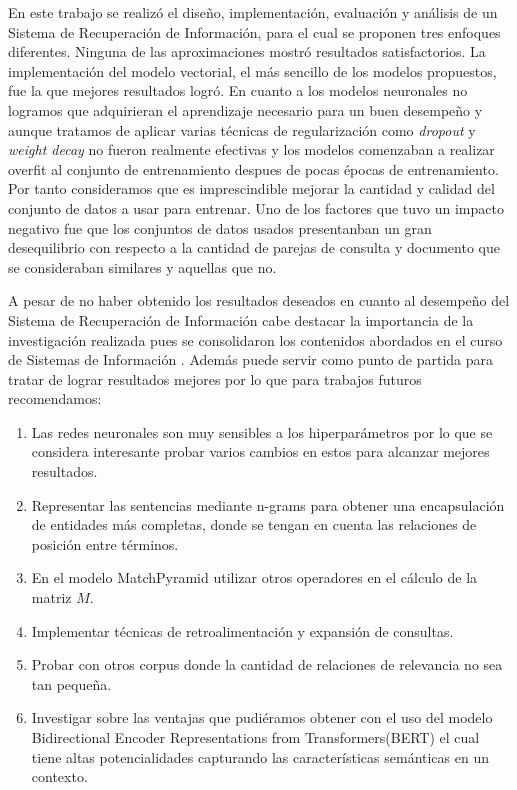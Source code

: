 \documentclass{llncs}
\begin{document}
 En este trabajo se realizó  el diseño, implementación, evaluación y análisis de un Sistema de Recuperación de Información, para el cual se proponen tres enfoques diferentes. Ninguna de las aproximaciones mostró resultados satisfactorios. La implementación del modelo vectorial, el más sencillo de los modelos propuestos, fue la que mejores resultados logró. En cuanto a los modelos neuronales no logramos que adquirieran el aprendizaje necesario para un buen desempeño y aunque tratamos de aplicar varias técnicas de regularización como \textit{dropout} y \textit{weight decay} no fueron realmente efectivas y los modelos comenzaban a realizar overfit al conjunto de entrenamiento despues de pocas épocas de entrenamiento. Por tanto consideramos que es imprescindible mejorar la cantidad y calidad del conjunto de datos a usar para entrenar. Uno de los factores que tuvo un impacto negativo fue que los conjuntos de datos usados presentanban un gran desequilibrio con respecto a la cantidad de parejas de consulta y documento que se consideraban similares y aquellas que no.
 
 A pesar de no haber obtenido los resultados deseados en cuanto al desempeño del Sistema de Recuperación de Información cabe destacar  la importancia de la investigación realizada pues se consolidaron los contenidos abordados en el curso de Sistemas de Información \cite{478}. Además puede servir como punto de partida para tratar de lograr resultados mejores por lo que para trabajos futuros recomendamos:

\begin{enumerate}
	\item Las redes neuronales son muy sensibles a los hiperparámetros por lo que se considera interesante probar varios cambios en estos para alcanzar mejores resultados.
	\item Representar las sentencias mediante n-grams para obtener una encapsulación de entidades más completas, donde se tengan en cuenta las relaciones de posición entre términos.
	\item En el modelo MatchPyramid utilizar otros operadores en el cálculo de la matriz $M$.
	\item Implementar técnicas de retroalimentación y expansión de consultas. 
	\item Probar con otros corpus donde la cantidad de relaciones de relevancia no sea tan pequeña.
	\item Investigar sobre las ventajas que pudiéramos obtener con el uso del modelo Bidirectional Encoder Representations from Transformers(BERT) el cual tiene altas potencialidades capturando las características semánticas en un contexto.
\end{enumerate}
\end{document}

